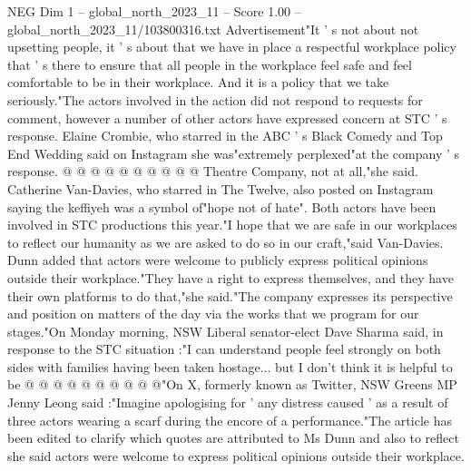 \begin{textsample}{NEG Dim 1 – global\_north\_2023\_11 – Score 1.00 – global\_north\_2023\_11/103800316.txt}
Advertisement"It ' s not about not upsetting people, it ' s about that we have in place a respectful workplace policy that ' s there to ensure that all people in the workplace feel safe and feel comfortable to be in their workplace.
And it is a policy that we take seriously."The actors involved in the action did not respond to requests for comment, however a number of other actors have expressed concern at STC ' s response.
Elaine Crombie, who starred in the ABC ' s Black Comedy and Top End Wedding said on Instagram she was"extremely perplexed"at the company ' s response. @ @ @ @ @ @ @ @ @ @ Theatre Company, not at all,"she said.
Catherine Van-Davies, who starred in The Twelve, also posted on Instagram saying the keffiyeh was a symbol of"hope not of hate".
Both actors have been involved in STC productions this year."I hope that we are safe in our workplaces to reflect our humanity as we are asked to do so in our craft,"said Van-Davies.
Dunn added that actors were welcome to publicly express political opinions outside their workplace."They have a right to express themselves, and they have their own platforms to do that,"she said."The company expresses its perspective and position on matters of the day via the works that we program for our stages."On Monday morning, NSW Liberal senator-elect Dave Sharma said, in response to the STC situation :"I can understand people feel strongly on both sides with families having been taken hostage... but I don't think it is helpful to be @ @ @ @ @ @ @ @ @ @"On X, formerly known as Twitter, NSW Greens MP Jenny Leong said :"Imagine apologising for ' any distress caused ' as a result of three actors wearing a scarf during the encore of a performance."The article has been edited to clarify which quotes are attributed to Ms Dunn and also to reflect she said actors were welcome to express political opinions outside their workplace.

\end{textsample}
